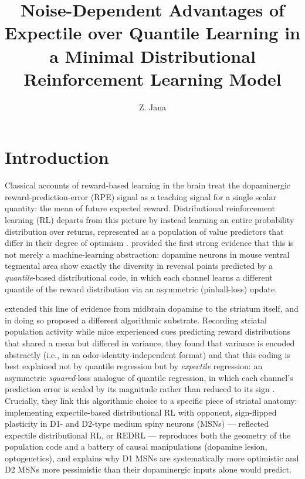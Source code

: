 \documentclass[11pt]{article}
\title{Noise-Dependent Advantages of Expectile over Quantile Learning in a Minimal Distributional Reinforcement Learning Model}
\author[1]{Z. Jana\orcidlink{0009-0009-3316-7476}}
\affil[1]{Department of Computer Science and Engineering,
The American University in Cairo}
\date{}
\begin{document}
\maketitle

\section{Introduction}
\label{sec:intro}

Classical accounts of reward-based learning in the brain treat the dopaminergic reward-prediction-error (RPE) signal as a teaching signal for a single scalar quantity: the mean of future expected reward. Distributional reinforcement learning (RL) departs from this picture by instead learning an entire probability distribution over returns, represented as a population of value predictors that differ in their degree of optimism \citep{bellemare2017}. \citet{dabney2020} provided the first strong evidence that this is not merely a machine-learning abstraction: dopamine neurons in mouse ventral tegmental area show exactly the diversity in reversal points predicted by a \emph{quantile}-based distributional code, in which each channel learns a different quantile of the reward distribution via an asymmetric (pinball-loss) update.

\citet{lowet2025} extended this line of evidence from midbrain dopamine to the striatum itself, and in doing so proposed a different algorithmic substrate. Recording striatal population activity while mice experienced cues predicting reward distributions that shared a mean but differed in variance, they found that variance is encoded abstractly (i.e., in an odor-identity-independent format) and that this coding is best explained not by quantile regression but by \emph{expectile} regression: an asymmetric \emph{squared}-loss analogue of quantile regression, in which each channel's prediction error is scaled by its magnitude rather than reduced to its sign \citep{rowland2019}. Crucially, they link this algorithmic choice to a specific piece of striatal anatomy: implementing expectile-based distributional RL with opponent, sign-flipped plasticity in D1- and D2-type medium spiny neurons (MSNs) --- reflected expectile distributional RL, or REDRL --- reproduces both the geometry of the population code and a battery of causal manipulations (dopamine lesion, optogenetics), and explains why D1 MSNs are systematically more optimistic and D2 MSNs more pessimistic than their dopaminergic inputs alone would predict.
\end{document}
